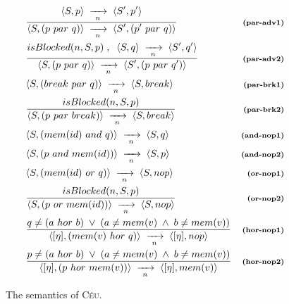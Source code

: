 \documentclass{acm_proc_article-sp}
\newcommand{\CEU}{\textsc{C\'{e}u}\xspace}
\newcommand{\ST}{\1\xrightarrow[~n~]{}\1}
\newcommand{\LL}{\langle}
\newcommand{\RR}{\rangle}
\newcommand{\DS}{\displaystyle}
\newcommand{\rr}[1] {{\textbf{\scriptsize{#1}}}}
\newcommand{\1}{\;}
\newcommand{\2}{\;\;}
\newcommand{\3}{\;\;\;}
\newcommand{\5}{\;\;\;\;\;}
\begin{document}
\begin{figure}
{\begin{eqnarray*}
& \frac
    {\DS \LL S,p \RR \ST \LL S',p' \RR }
    {\DS \LL S, (p~par~q) \RR \ST \LL S', (p'~par~q) \RR }
    & \rr{(par-adv1)}      \\
& \frac
    {\DS isBlocked(n,S,p) \1,\2 \LL S,q \RR \ST \LL S',q' \RR }
    {\DS \LL S, (p~par~q) \RR \ST \LL S', (p~par~q') \RR }
    & \rr{(par-adv2)}      \\
& \LL S, (break~par~q) \RR \ST \LL S, break \RR
    & \rr{(par-brk1)}   \\
& \frac
    {\DS isBlocked(n,S,p) }
    {\DS \LL S, (p~par~break) \RR \ST \LL S, break \RR }
    & \rr{(par-brk2)}   \\
%
%
& \LL S, (mem(id)~and~q) \RR \ST \LL S, q \RR
    & \rr{(and-nop1)}   \\
& \LL S, (p~and~mem(id)) \RR \ST \LL S, p \RR
    & \rr{(and-nop2)}   \\
& \LL S, (mem(id)~or~q) \RR \ST \LL S, nop \RR
    & \rr{(or-nop1)}   \\
& \frac
    {\DS isBlocked(n,S,p) }
    {\DS \LL S, (p~or~mem(id)) \RR \ST \LL S, nop \RR }
    & \rr{(or-nop2)}   \\
& \frac
    {\DS q \neq (a~hor~b) \1\vee\1 (a \neq mem(v) \1\wedge\1 b \neq mem(v)) }
    {\DS \LL [\eta], (mem(v)~hor~q) \RR \ST \LL [\eta], nop \RR }
    & \rr{(hor-nop1)}   \\
& \frac
    {\DS p \neq (a~hor~b) \1\vee\1 (a \neq mem(v) \1\wedge\1 b \neq mem(v)) }
    {\DS \LL [\eta], (p~hor~mem(v)) \RR \ST \LL [\eta], mem(v) \RR }
    & \rr{(hor-nop2)}
%
\end{eqnarray*}
}
%
\caption{ The semantics of \CEU.
\label{fig.sem}
}
\end{figure}
\end{document}
